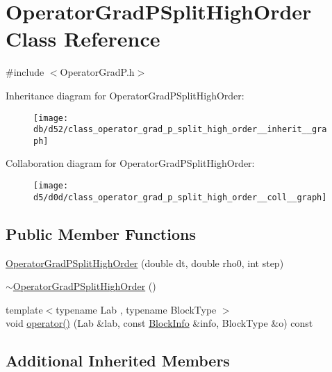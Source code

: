 \hypertarget{class_operator_grad_p_split_high_order}{}\section{Operator\+Grad\+P\+Split\+High\+Order Class Reference}
\label{class_operator_grad_p_split_high_order}


{\ttfamily \#include $<$Operator\+Grad\+P.\+h$>$}



Inheritance diagram for Operator\+Grad\+P\+Split\+High\+Order\+:\nopagebreak
\begin{figure}[H]
\begin{center}
\leavevmode
\texttt{[image: db/d52/class\_operator\_grad\_p\_split\_high\_order\_\_inherit\_\_graph]}
\end{center}
\end{figure}


Collaboration diagram for Operator\+Grad\+P\+Split\+High\+Order\+:\nopagebreak
\begin{figure}[H]
\begin{center}
\leavevmode
\texttt{[image: d5/d0d/class\_operator\_grad\_p\_split\_high\_order\_\_coll\_\_graph]}
\end{center}
\end{figure}
\subsection*{Public Member Functions}
\begin{DoxyCompactItemize}
\item 
\hyperlink{class_operator_grad_p_split_high_order_a618b48adbb0857d72df05bb4a960ef35}{Operator\+Grad\+P\+Split\+High\+Order} (double dt, double rho0, int step)
\item 
\hyperlink{class_operator_grad_p_split_high_order_a959a49282859f66d8f8b0edf192390ea}{$\sim$\+Operator\+Grad\+P\+Split\+High\+Order} ()
\item 
{\footnotesize template$<$typename Lab , typename Block\+Type $>$ }\\void \hyperlink{class_operator_grad_p_split_high_order_af1a9134e8ea512934a867636afc033b7}{operator()} (Lab \&lab, const \hyperlink{struct_block_info}{Block\+Info} \&info, Block\+Type \&o) const 
\end{DoxyCompactItemize}
\subsection*{Additional Inherited Members}


